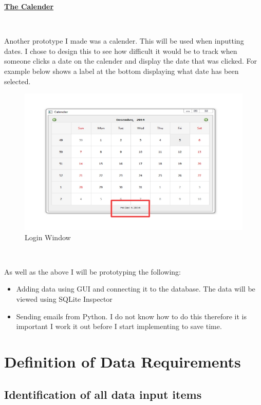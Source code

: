 \newpage

\underline {\textbf{The Calender}}

\

Another prototype I made was a calender. This will be used when inputting dates. I chose to design this to see how difficult it would be to track when someone clicks a date on the calender and display the date that was clicked. For example below shows a label at the bottom displaying what date has been selected.

\begin{figure}[H]
\includegraphics[width=\textwidth]{Calender.jpg}
\caption{Login Window}
\end{figure}

\

As well as the above I will be prototyping the following:

\begin{itemize}
\item Adding data using GUI and connecting it to the database. The data will be viewed using SQLite Inspector
\item Sending emails from Python. I do not know how to do this therefore it is important I work it out before I start implementing to save time.
\end{itemize}


\section{Definition of Data Requirements}

\subsection{Identification of all data input items}


